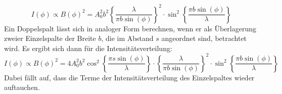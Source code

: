 \begin{equation}
  I(\phi) \propto B(\phi)^2 = A_0^2 b^2 \left\{\frac{\lambda}{\pi b \sin(\phi)}\right\}^2 \cdot \sin^2 \left\{ \frac{\pi b \sin(\phi)}{\lambda} \right\}
  \label{eqn:einzel}
\end{equation}
Ein Doppelspalt lässt sich in analoger Form berechnen, wenn er als Überlagerung
zweier Einzelspalte der Breite $b$, die im Abstand $s$ angeordnet sind, betrachtet wird.
Es ergibt sich dann für die Intensitätsverteilung:
\begin{equation}
  I(\phi) \propto B(\phi)^2 = 4 A_0^2 b^2 \cos^2 \left\{ \frac{\pi s \sin(\phi)}{\lambda} \right\} \cdot \left\{\frac{\lambda}{\pi b \sin(\phi)}\right\}^2 \cdot \sin^2 \left\{ \frac{\pi b \sin(\phi)}{\lambda} \right\}
  \label{eqn:doppel}
\end{equation}
Dabei fällt auf, dass die Terme der Intensitätsverteilung des Einzelspaltes wieder auftauchen.
